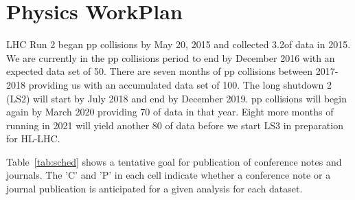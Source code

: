 \documentclass[11pt]{article}
\begin{document}
\section{Physics WorkPlan}
\label{sec:work}
LHC Run 2 began pp collisions by May 20, 2015 and collected 3.2\invfb of data in 2015.  We are currently in the pp collisions period to end by December 2016 with an expected data set of 50\invfb.
There are seven months of pp collisions between 2017-2018 providing us with an accumulated data set of 100\invfb.  The long shutdown 2 (LS2) will start by July 2018 and end by December 2019.
pp collisions will begin again by March 2020 providing 70 \invfb of data in that year. Eight more months of running in 2021 will yield another 80 \invfb of data before we start LS3 in preparation for HL-LHC.



Table~\ref{tab:sched} shows a tentative goal for publication of conference notes and journals.  The 'C' and 'P' in each cell indicate whether a conference note or a journal publication is anticipated for a given analysis for each dataset.




\end{document}
